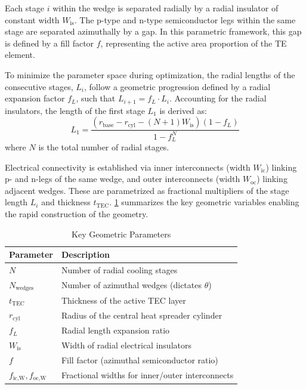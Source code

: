 \documentclass[conference,a4paper]{IEEEtran}
\begin{document}
Each stage $i$ within the wedge is separated radially by a radial insulator of constant width $W_{\text{is}}$. The p-type and n-type semiconductor legs within the same stage are separated azimuthally by a gap. In this parametric framework, this gap is defined by a fill factor $f$, representing the active area proportion of the TE element.

To minimize the parameter space during optimization, the radial lengths of the consecutive stages, $L_i$, follow a geometric progression defined by a radial expansion factor $f_L$, such that $L_{i+1} = f_L \cdot L_i$. Accounting for the radial insulators, the length of the first stage $L_1$ is derived as:
\begin{equation}
	L_1 = \frac{(r_{\text{base}} - r_{\text{cyl}} - (N+1) W_{\text{is}}) (1-f_L)}{1-f_L^{N}}
\end{equation}
where $N$ is the total number of radial stages.

Electrical connectivity is established via inner interconnects (width $W_{\text{ic}}$) linking p- and n-legs of the same wedge, and outer interconnects (width $W_{\text{oc}}$) linking adjacent wedges. These are parametrized as fractional multipliers of the stage length $L_i$ and thickness $t_{\text{TEC}}$. \cref{tab:geom_params} summarizes the key geometric variables enabling the rapid construction of the geometry.

\begin{table}[H]
	\centering
	\caption{Key Geometric Parameters}
	\label{tab:geom_params}
	\begin{tabular}{@{}ll@{}}
		\toprule
		\textbf{Parameter}                 & \textbf{Description}                            \\
		\midrule
		$N$                                & Number of radial cooling stages                 \\
		$N_{\text{wedges}}$                & Number of azimuthal wedges (dictates $\theta$)  \\
		$t_{\text{TEC}}$                   & Thickness of the active TEC layer               \\
		$r_{\text{cyl}}$                   & Radius of the central heat spreader cylinder    \\
		$f_L$                              & Radial length expansion ratio                   \\
		$W_{\text{is}}$                    & Width of radial electrical insulators           \\
		$f$                                & Fill factor (azimuthal semiconductor ratio)     \\
		$f_{\text{ic,W}}, f_{\text{oc,W}}$ & Fractional widths for inner/outer interconnects \\
		\bottomrule
	\end{tabular}
\end{table}
\end{document}
